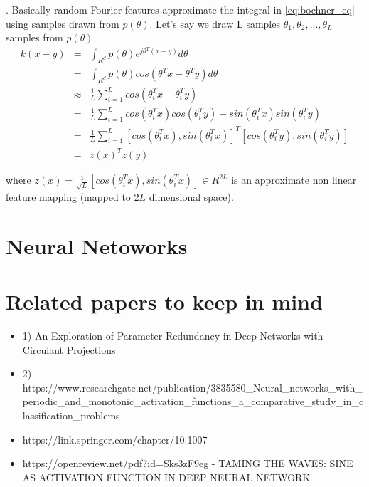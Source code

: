 \documentclass[]{article}
\begin{document}
 \cite{rahimi2007random}. Basically random Fourier features approximate the integral in \ref{eq:bochner_eq} using samples drawn from $p(\theta)$. Let's say we draw L samples $\theta_1, \theta_2,..., \theta_L$ samples from $p(\theta)$. 
\begin{eqnarray*}
    \label{eq:rff}
    k(x-y)  &=& \int_{R^d} p(\theta)e^{j\theta^T(x-y)}d\theta  \\
    &=&   \int_{R^d} p(\theta)cos(\theta^Tx-\theta^Ty)d\theta   \\
   & \approx & \frac {1}{L} \sum_{i=1}^{L} cos(\theta_i^Tx-\theta_i^Ty)\\
 	&=& \frac {1}{L} \sum_{i=1}^{L} cos(\theta_i^Tx) cos(\theta_i^Ty) + sin(\theta_i^Tx) sin(\theta_i^Ty)\\
	&=& \frac {1}{L} \sum_{i=1}^{L} [cos(\theta_i^Tx) , sin(\theta_i^Tx)]^T [cos(\theta_i^Ty)  , sin(\theta_i^Ty)] \\
	&=& z(x)^Tz(y)
\end{eqnarray*}

where $z(x) =  \frac {1}{\sqrt L} [cos(\theta_i^Tx) , sin(\theta_i^Tx)] \in R^{2L}$ is an approximate non linear feature mapping (mapped to $2L$ dimensional space).  
%


\section{Neural Netoworks}


\section{Related papers to keep in mind}

\begin{itemize}
    \item 1) An Exploration of Parameter Redundancy in Deep Networks with Circulant Projections
    \item 2) https://www.researchgate.net/publication/3835580_Neural_networks_with_periodic_and_monotonic_activation_functions_a_comparative_study_in_classification_problems
    \item https://link.springer.com/chapter/10.1007%
    \item  https://openreview.net/pdf?id=Sks3zF9eg - TAMING THE WAVES: SINE AS ACTIVATION FUNCTION IN DEEP NEURAL NETWORK
\end{itemize}
\end{document}
